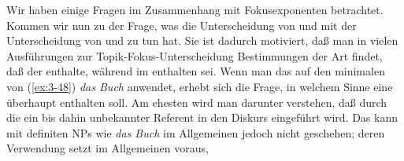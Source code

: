 \documentclass[output=paper]{langsci/langscibook}
\begin{document}
\largerpage
\noindent Wir haben einige Fragen im Zusammenhang mit Fokusexponenten
betrachtet. Kommen wir nun zu der Frage, was die Unterscheidung von
 und  mit der Unterscheidung von  und
 zu tun hat. Sie ist dadurch motiviert, daß man in vielen
Ausführungen zur Topik-Fokus-Unterscheidung Bestimmungen der Art
findet, daß der   enthalte, während im
  enthalten sei. Wenn man das
\zb auf den minimalen  von (\ref{ex:3-48}) \textit{das Buch} anwendet, erhebt sich
die Frage, in welchem Sinne eine  überhaupt
 enthalten soll. Am ehesten wird man darunter
verstehen, daß durch die  ein bis dahin unbekannter Referent in den
Diskurs eingeführt wird. Das kann mit definiten NPs wie \textit{das Buch}
im Allgemeinen jedoch nicht geschehen; deren Verwendung setzt im Allgemeinen voraus,
\end{document}
